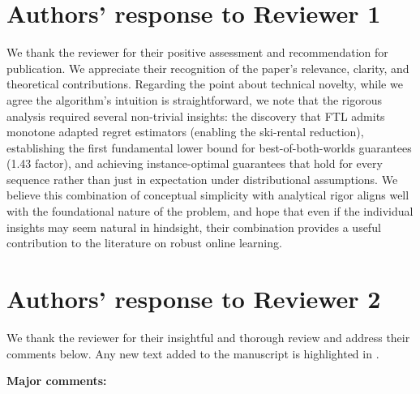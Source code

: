\documentclass[11pt]{article}
\begin{document}
\newpage
\section*{Authors' response to Reviewer 1}

We thank the reviewer for their positive assessment and recommendation for publication. We appreciate their recognition of the paper's relevance, clarity, and theoretical contributions. Regarding the point about technical novelty, while we agree the algorithm's intuition is straightforward, we note that the rigorous analysis required several non-trivial insights: the discovery that FTL admits monotone adapted regret estimators (enabling the ski-rental reduction), establishing the first fundamental lower bound for best-of-both-worlds guarantees (1.43 factor), and achieving instance-optimal guarantees that hold for every sequence rather than just in expectation under distributional assumptions. We believe this combination of conceptual simplicity with analytical rigor aligns well with the foundational nature of the problem, and hope that even if the individual insights may seem natural in hindsight, their combination provides a useful contribution to the literature on robust online learning.
\newpage 


\section*{Authors' response to Reviewer 2}

We thank the reviewer for their insightful and thorough review and address their comments below. Any new text added to the manuscript is highlighted in . 

{\bf Major comments:}
\end{document}
